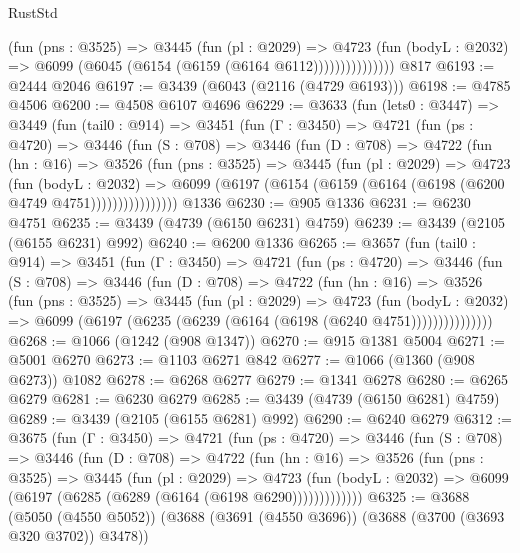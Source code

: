 \begin{lexlean}{RustStd}
\begin{coremodule}
                    (fun (pns : @3525) =>
                    @3445
                      (fun (pl : @2029) =>
                      @4723
                        (fun (bodyL : @2032) =>
                        @6099 (@6045 (@6154 (@6159 (@6164 @6112)))))))))))))))
    @817
@6193 := @2444 @2046
@6197 := @3439 (@6043 (@2116 (@4729 @6193)))
@6198 := @4785 @4506
@6200 := @4508 @6107 @4696
@6229 := @3633
    (fun (lets0 : @3447) =>
    @3449
      (fun (tail0 : @914) =>
      @3451
        (fun (Γ : @3450) =>
        @4721
          (fun (ps : @4720) =>
          @3446
            (fun (S : @708) =>
            @3446
              (fun (D : @708) =>
              @4722
                (fun (hn : @16) =>
                @3526
                  (fun (pns : @3525) =>
                  @3445
                    (fun (pl : @2029) =>
                    @4723
                      (fun (bodyL : @2032) =>
                      @6099 (@6197 (@6154 (@6159 (@6164 (@6198 (@6200 @4749 @4751))))))))))))))))
    @1336
@6230 := @905 @1336
@6231 := @6230 @4751
@6235 := @3439 (@4739 (@6150 @6231) @4759)
@6239 := @3439 (@2105 (@6155 @6231) @992)
@6240 := @6200 @1336
@6265 := @3657
    (fun (tail0 : @914) =>
    @3451
      (fun (Γ : @3450) =>
      @4721
        (fun (ps : @4720) =>
        @3446
          (fun (S : @708) =>
          @3446
            (fun (D : @708) =>
            @4722
              (fun (hn : @16) =>
              @3526
                (fun (pns : @3525) =>
                @3445
                  (fun (pl : @2029) =>
                  @4723
                    (fun (bodyL : @2032) =>
                    @6099 (@6197 (@6235 (@6239 (@6164 (@6198 (@6240 @4751)))))))))))))))
@6268 := @1066 (@1242 (@908 @1347))
@6270 := @915 @1381 @5004
@6271 := @5001 @6270
@6273 := @1103 @6271 @842
@6277 := @1066 (@1360 (@908 @6273)) @1082
@6278 := @6268 @6277
@6279 := @1341 @6278
@6280 := @6265 @6279
@6281 := @6230 @6279
@6285 := @3439 (@4739 (@6150 @6281) @4759)
@6289 := @3439 (@2105 (@6155 @6281) @992)
@6290 := @6240 @6279
@6312 := @3675
    (fun (Γ : @3450) =>
    @4721
      (fun (ps : @4720) =>
      @3446
        (fun (S : @708) =>
        @3446
          (fun (D : @708) =>
          @4722
            (fun (hn : @16) =>
            @3526
              (fun (pns : @3525) =>
              @3445
                (fun (pl : @2029) =>
                @4723
                  (fun (bodyL : @2032) =>
                  @6099 (@6197 (@6285 (@6289 (@6164 (@6198 @6290)))))))))))))
@6325 := @3688
    (@5050 (@4550 @5052))
    (@3688 (@3691 (@4550 @3696)) (@3688 (@3700 (@3693 @320 @3702)) @3478))

\end{coremodule}
\end{lexlean}
